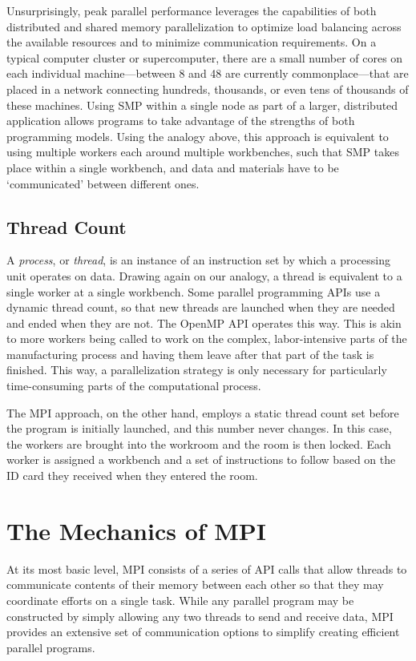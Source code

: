 Unsurprisingly, peak parallel performance leverages the capabilities of both
distributed and shared memory parallelization to optimize load balancing across
the available resources and to minimize communication requirements. On a typical
computer cluster or supercomputer, there are a small number of cores on each
individual machine---between 8 and 48 are currently commonplace---that are
placed in a network connecting hundreds, thousands, or even tens of thousands of
these machines. Using SMP within a single node as part of a larger, distributed
application allows programs to take advantage of the strengths of both
programming models. \cite{Lusk2008} Using the analogy above, this approach is
equivalent to using multiple workers each around multiple workbenches, such that
SMP takes place within a single workbench, and data and materials have to be
`communicated' between different ones.

\subsection{Thread Count}

A \emph{process}, or \emph{thread}, is an instance of an instruction set by
which a processing unit operates on data. Drawing again on our analogy, a thread
is equivalent to a single worker at a single workbench. Some parallel
programming APIs use a dynamic thread count, so that new threads are launched
when they are needed and ended when they are not. The OpenMP API operates this
way. This is akin to more workers being called to work on the complex,
labor-intensive parts of the manufacturing process and having them leave after
that part of the task is finished. This way, a parallelization strategy is only
necessary for particularly time-consuming parts of the computational process.

The MPI approach, on the other hand, employs a static thread count set before
the program is initially launched, and this number never changes. In this case,
the workers are brought into the workroom and the room is then locked. Each
worker is assigned a workbench and a set of instructions to follow based on the
ID card they received when they entered the room.

\section{The Mechanics of MPI}

At its most basic level, MPI consists of a series of API calls that allow
threads to communicate contents of their memory between each other so that they
may coordinate efforts on a single task. While any parallel program may be
constructed by simply allowing any two threads to send and receive data, MPI
provides an extensive set of communication options to simplify creating
efficient parallel programs.

